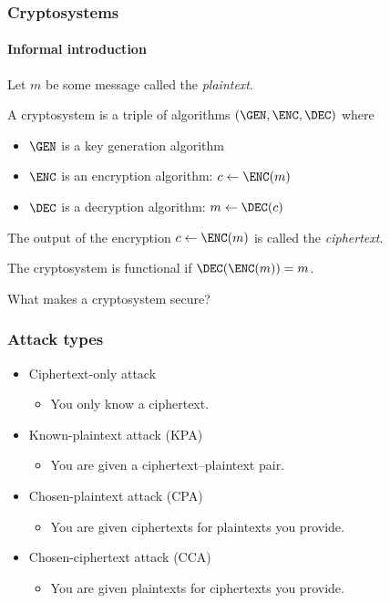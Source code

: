\begin{frame}
  \frametitle{Cryptosystems}
  \framesubtitle{Informal introduction}

  \pause
  Let $m$ be some message called the \emph{plaintext}.

  \vspace*{1em}

  \pause
  A cryptosystem is a triple of algorithms $(\GEN,\ENC,\DEC)$ where
  \begin{itemize}[<+(1)->]
    \item $\GEN$ is a key generation algorithm
    \item $\ENC$ is an encryption algorithm: $c\gets\ENC(m)$
    \item $\DEC$ is a decryption algorithm: $m\gets\DEC(c)$
  \end{itemize}

  \vspace*{1em}

  \pause
  The output of the encryption $c\gets\ENC(m)$ is called the \emph{ciphertext}.

  \vspace*{1em}

  \pause
  The cryptosystem is functional if $\DEC(\ENC(m))=m$.
\end{frame}

\begin{frame}[c]
  \centering
  What makes a cryptosystem secure?
\end{frame}

\begin{frame}
  \frametitle{Attack types}

  \begin{itemize}[<+(1)->]
    \item Ciphertext-only attack
    \begin{itemize}
      \item You only know a ciphertext.
    \end{itemize}
    \item Known-plaintext attack (KPA)
    \begin{itemize}
      \item You are given a ciphertext--plaintext pair.
    \end{itemize}
    \item Chosen-plaintext attack (CPA)
    \begin{itemize}
      \item You are given ciphertexts for plaintexts you provide.
    \end{itemize}
    \item Chosen-ciphertext attack (CCA)
    \begin{itemize}
      \item You are given plaintexts for ciphertexts you provide.
    \end{itemize}
  \end{itemize}
\end{frame}

